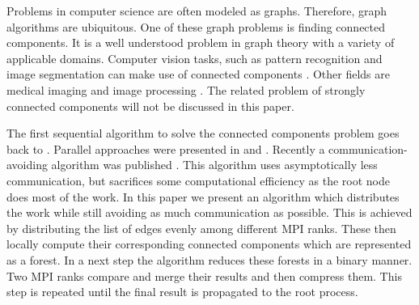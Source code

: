 

Problems in computer science are often modeled as graphs. Therefore, graph algorithms are
ubiquitous. One of these graph problems is finding connected components. It is a well understood
problem in graph theory with a variety of applicable domains. Computer vision tasks, such as
pattern recognition and image segmentation \cite{683775} can make use of connected components
\cite{Wilson:2006:RCV:1166253.1166292}. Other fields are medical imaging \cite{UDUPA1990355} and
image processing \cite{Ambrosio2001}. The related problem of strongly connected components will not
be discussed in this paper.

The first sequential algorithm to solve the connected components problem goes back to
\cite{Hopcroft}. Parallel approaches were presented in \cite{MANOHAR1989133} and
\cite{Han:1990:EFP:79147.214077}. Recently a communication-avoiding algorithm was published \cite{comm_avoiding}.
This algorithm uses asymptotically less communication, but sacrifices some computational
efficiency as the root node does most of the work. In this paper we present an algorithm which
distributes the work while still avoiding as much communication as possible. This is achieved by
distributing the list of edges evenly among different MPI ranks. These then locally compute their
corresponding connected components which are represented as a forest. In a next step the algorithm
reduces these forests in a binary manner. Two MPI ranks compare and merge their results and then
compress them. This step is repeated until the final result is propagated to the root process.



